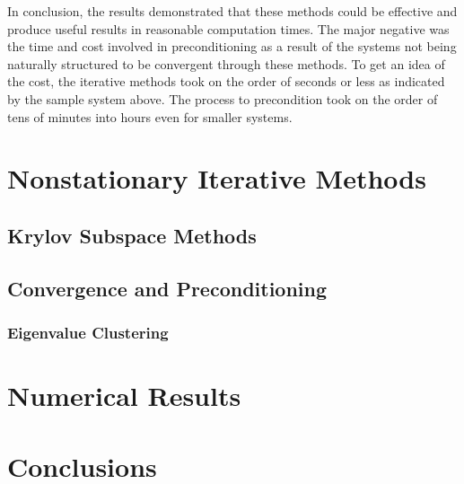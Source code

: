 \documentclass[10pt]{article}
\begin{document}
\begin{multicols}{2}
In conclusion, the results demonstrated that these methods could be effective and produce useful results in reasonable computation times.
The major negative was the time and cost involved in preconditioning as a result of the systems not being naturally structured to be convergent through these methods.
To get an idea of the cost, the iterative methods took on the order of seconds or less as indicated by the sample system above.
The process to precondition took on the order of tens of minutes into hours even for smaller systems.

\section{Nonstationary Iterative Methods}
\subsection{Krylov Subspace Methods}
\subsection{Convergence and Preconditioning}
\subsubsection{Eigenvalue Clustering}

\section{Numerical Results}

\section{Conclusions}

\nocite{*}


\end{multicols}
\end{document}
